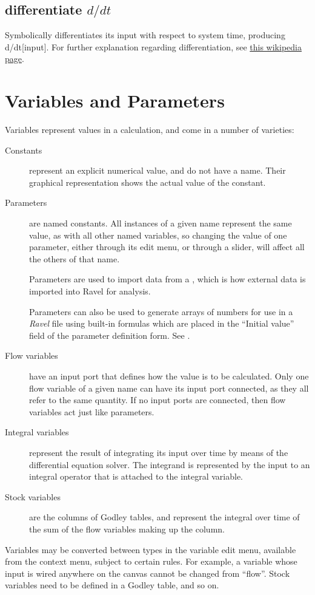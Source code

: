 \subsection{differentiate $d/dt$}


\label{Operation:differentiate} Symbolically differentiates its input
with respect to system time, producing d/dt{[}input{]}. For further
explanation regarding differentiation, see \href{https://en.wikipedia.org/wiki/Derivative}{this wikipedia page}.


\section{Variables and Parameters}

\label{Variables}\label{Variable:constant}\label{VarConstant}\label{Variable:parameter}
\label{Variable:flow}\label{Variable:integral}\label{Variable:stock}


Variables represent values in a calculation, and come in a number
of varieties: 
\begin{description}
\item [{Constants}] represent an explicit numerical value, and do not have
a name. Their graphical representation shows the actual value of the
constant. 
\item [{Parameters}] are named constants. All instances of a given name
represent the same value, as with all other named variables, so changing
the value of one parameter, either through its edit menu, or through
a slider, will affect all the others of that name.

Parameters are used to import data from a ,
which is how external data is imported into Ravel for analysis.

Parameters can also be used to generate arrays of numbers for
use in a \emph{Ravel} file using built-in formulas which are placed
in the ``Initial value'' field of the parameter definition form.
See .
\item [{Flow variables}] have an input port that defines how the value
is to be calculated. Only one flow variable of a given name can have
its input port connected, as they all refer to the same quantity.
If no input ports are connected, then flow variables act just like
parameters. 
\item [{Integral variables}] represent the result of integrating its input
over time by means of the differential equation solver. The integrand
is represented by the input to an integral operator that is attached
to the integral variable. 
\item [{Stock variables}] are the columns of Godley tables, and represent
the integral over time of the sum of the flow variables making up
the column. 
\end{description}
Variables may be converted between types in the variable edit menu,
available from the context menu, subject to certain rules. For example,
a variable whose input is wired anywhere on the canvas cannot be changed
from ``flow''. Stock variables need to be defined in a Godley table,
and so on.

